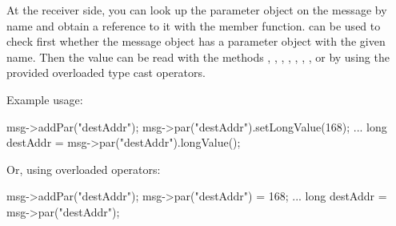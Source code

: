 At the receiver side, you can look up the parameter object on the message
by name and obtain a reference to it with the  member function.
 can be used to check first whether the message object has a parameter
object with the given name. Then the value can be read with the methods
, , ,
, , ,
, or by using the provided overloaded type cast operators.

Example usage:

\begin{cpp}
msg->addPar("destAddr");
msg->par("destAddr").setLongValue(168);
...
long destAddr = msg->par("destAddr").longValue();
\end{cpp}

Or, using overloaded operators:

\begin{cpp}
msg->addPar("destAddr");
msg->par("destAddr") = 168;
...
long destAddr = msg->par("destAddr");
\end{cpp}

